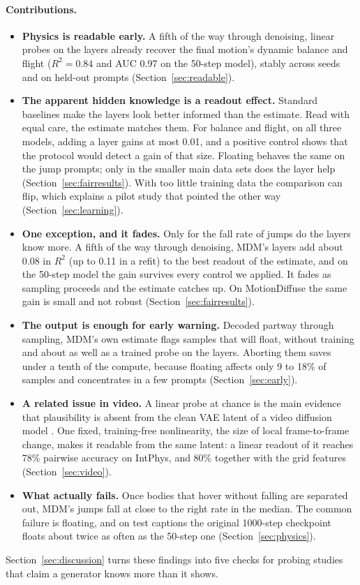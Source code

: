 \paragraph{Contributions.}
\begin{itemize}
    \item \textbf{Physics is readable early.} A fifth of the way through denoising, linear probes on the layers already recover the final motion's dynamic balance and flight ($R^2 = 0.84$ and AUC 0.97 on the 50-step model), stably across seeds and on held-out prompts (Section~\ref{sec:readable}).
    \item \textbf{The apparent hidden knowledge is a readout effect.} Standard baselines make the layers look better informed than the estimate. Read with equal care, the estimate matches them. For balance and flight, on all three models, adding a layer gains at most 0.01, and a positive control shows that the protocol would detect a gain of that size. Floating behaves the same on the jump prompts; only in the smaller main data sets does the layer help (Section~\ref{sec:fairresults}). With too little training data the comparison can flip, which explains a pilot study that pointed the other way (Section~\ref{sec:learning}).
    \item \textbf{One exception, and it fades.} Only for the fall rate of jumps do the layers know more. A fifth of the way through denoising, MDM's layers add about 0.08 in $R^2$ (up to 0.11 in a refit) to the best readout of the estimate, and on the 50-step model the gain survives every control we applied. It fades as sampling proceeds and the estimate catches up. On MotionDiffuse the same gain is small and not robust (Section~\ref{sec:fairresults}).
    \item \textbf{The output is enough for early warning.} Decoded partway through sampling, MDM's own estimate flags samples that will float, without training and about as well as a trained probe on the layers. Aborting them saves under a tenth of the compute, because floating affects only 9 to 18\% of samples and concentrates in a few prompts (Section~\ref{sec:early}).
    \item \textbf{A related issue in video.} A linear probe at chance is the main evidence that plausibility is absent from the clean VAE latent of a video diffusion model \citep{esmati2026invisible}. One fixed, training-free nonlinearity, the size of local frame-to-frame change, makes it readable from the same latent: a linear readout of it reaches 78\% pairwise accuracy on IntPhys, and 80\% together with the grid features (Section~\ref{sec:video}).
    \item \textbf{What actually fails.} Once bodies that hover without falling are separated out, MDM's jumps fall at close to the right rate in the median. The common failure is floating, and on test captions the original 1000-step checkpoint floats about twice as often as the 50-step one (Section~\ref{sec:physics}).
\end{itemize}
Section~\ref{sec:discussion} turns these findings into five checks for probing studies that claim a generator knows more than it shows.
